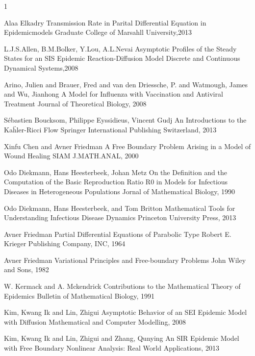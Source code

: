 \documentclass[11pt]{amsart}
\numberwithin{equation}{section}
\theoremstyle{plain}
\theoremstyle{definition}
\begin{document}
%
%
\begin{thebibliography}{1}

Alaa Elkadry
Transmission Rate in Parital Differential Equation in Epidemicmodels
Graduate College of Marsahll University,2013

L.J.S.Allen, B.M.Bolker, Y.Lou, A.L.Nevai
Asymptotic Profiles of the Steady States for an SIS Epidemic Reaction-Diffusion Model
Discrete and Continuous Dynamical Systems,2008

Arino, Julien and Brauer, Fred and van den Driessche, P. and Watmough, James and Wu, Jianhong
A Model for Influenza with Vaccination and Antiviral Treatment
Journal of Theoretical Biology, 2008

S\'ebastien Boucksom, Philippe Eyssidieus, Vincent Gudj
An Introductions to the Ka\"hler-Ricci Flow
Springer International Publishing Switzerland, 2013

Xinfu Chen and Avner Friedman
A Free Boundary Problem Arising in a Model of Wound Healing
SIAM J.MATH.ANAL, 2000

Odo Diekmann, Hans Heesterbeek, Johan Metz
On the Definition and the Computation of the Basic Reproduction Ratio R0 in Models for Infectious Diseases in Heterogeneous Populations
Jornal of Mathematical Biology, 1990

Odo Diekmann, Hans Heesterbeek, and Tom Britton
Mathematical Tools for Understanding Infectious Disease Dynamics
Princeton University Press, 2013

Avner Friedman
Partial Differential Equations of Parabolic Type
Robert E. Krieger Publishing Company, INC, 1964

Avner Friedman
Variational Principles and Free-boundary Problems
John Wiley and Sons, 1982

W. Kermack and A. Mckendrick
Contributions to the Mathematical Theory of Epidemics
Bulletin of Mathematical Biology, 1991

Kim, Kwang Ik and Lin, Zhigui
Asymptotic Behavior of an SEI Epidemic Model with Diffusion
Mathematical and Computer Modelling, 2008

Kim, Kwang Ik and Lin, Zhigui and Zhang, Qunying
An SIR Epidemic Model with Free Boundary
Nonlinear Analysis: Real World Applications, 2013


\end{thebibliography}
\end{document}
